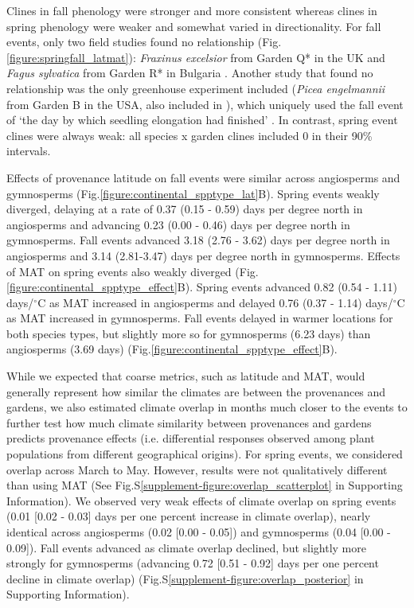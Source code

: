 \documentclass[12pt]{article}
\begin{document}

Clines in fall phenology were stronger and more consistent whereas clines in spring phenology were weaker and somewhat varied in directionality. For fall events, only two field studies found no relationship (Fig.\ref{figure:springfall_latmat}): \emph{Fraxinus excelsior} from Garden Q* in the UK \citep{rosique22} and \emph{Fagus sylvatica} from Garden R* in Bulgaria \citep{petkova17}. Another study that found no relationship was the only greenhouse experiment included (\emph{Picea engelmannii} from Garden B in the USA, also included in \citealp{AitkenBemmels16}), which uniquely used the fall event of `the day by which seedling elongation had finished' \citep{rehfeldt94}. In contrast, spring event clines were always weak: all species x garden clines included 0 in their 90\% intervals.


Effects of provenance latitude on fall events were similar across angiosperms and gymnosperms (Fig.\ref{figure:continental_spptype_lat}B). Spring events weakly diverged, delaying at a rate of 0.37 (0.15 - 0.59) days per degree north in angiosperms and advancing 0.23 (0.00 - 0.46) days per degree north in gymnosperms. Fall events advanced 3.18 (2.76 - 3.62) days per degree north in angiosperms and 3.14 (2.81-3.47) days per degree north in gymnosperms.
Effects of MAT on spring events also weakly diverged (Fig.\ref{figure:continental_spptype_effect}B). Spring events advanced 0.82 (0.54 - 1.11) days/$^{\circ}$C as MAT increased in angiosperms and delayed 0.76 (0.37 - 1.14) days/$^{\circ}$C as MAT increased in gymnosperms. Fall events delayed in warmer locations for both species types, but slightly more so for gymnosperms (6.23 days) than angiosperms (3.69 days) (Fig.\ref{figure:continental_spptype_effect}B).

While we expected that coarse metrics, such as latitude and MAT, would generally represent how similar the climates are between the provenances and gardens, we also estimated climate overlap in months much closer to the events to further test how much climate similarity between provenances and gardens predicts provenance effects (i.e. differential responses observed among plant populations from different geographical origins). For spring events, we considered overlap across March to May. However, results were not qualitatively different than using MAT (See Fig.S\ref{supplement-figure:overlap_scatterplot} in Supporting Information). We observed very weak effects of climate overlap on spring events (0.01 [0.02 - 0.03] days per one percent increase in climate overlap), nearly identical across angiosperms (0.02 [0.00 - 0.05]) and gymnosperms (0.04 [0.00 - 0.09]). Fall events advanced as climate overlap declined, but slightly more strongly for gymnosperms (advancing 0.72 [0.51 - 0.92] days per one percent decline in climate overlap) (Fig.S\ref{supplement-figure:overlap_posterior} in Supporting Information).
\end{document}
